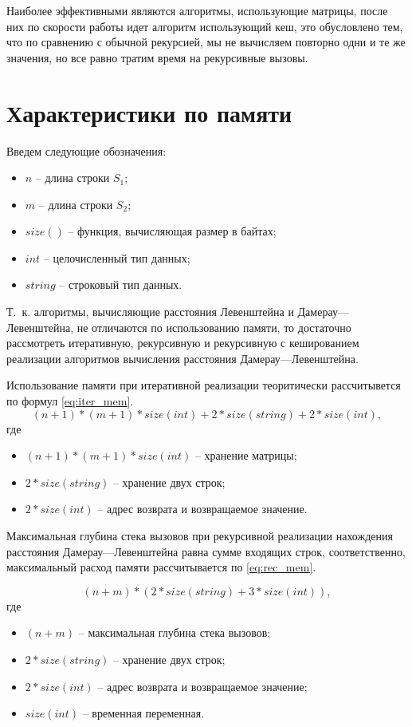 \clearpage

Наиболее эффективными являются алгоритмы, использующие матрицы, после них по скорости работы идет алгоритм использующий кеш, это обусловлено тем, что по сравнению с обычной рекурсией, мы не вычисляем повторно одни и те же значения, но все равно тратим время на рекурсивные вызовы. 

\section{Характеристики по памяти}

\label{memory}

Введем следующие обозначения:
\begin{itemize}
	\item $n$ -- длина строки $S_1$;
	\item $m$ -- длина строки $S_2$;
	\item $size()$ -- функция, вычисляющая размер в байтах;
	\item $int$ -- целочисленный тип данных;
	\item $string$ -- строковый тип данных.
\end{itemize}

Т.~к. алгоритмы, вычисляющие расстояния Левенштейна и Дамерау---Левенштейна, не отличаются по использованию памяти, то достаточно рассмотреть итеративную, рекурсивную и рекурсивную с кешированием реализации алгоритмов вычисления расстояния Дамерау---Левенштейна.


Использование памяти при итеративной реализации теоритически рассчитывется по формул \eqref{eq:iter_mem}.
\begin{equation}
	\label{eq:iter_mem}
	(n + 1) * (m + 1) * size(int) + 2 * size(string) + 2 * size(int),
\end{equation}
где 
\begin{itemize}
	\item $ (n + 1) * (m + 1) * size(int) $ -- хранение матрицы;
	\item $ 2 * size(string) $ -- хранение двух строк;
	\item $ 2 * size(int) $ -- адрес возврата и возвращаемое значение.
\end{itemize}


Максимальная глубина стека вызовов при рекурсивной реализации
нахождения расстояния Дамерау---Левенштейна равна сумме входящих строк,
соответственно, максимальный расход памяти рассчитывается по \eqref{eq:rec_mem}.

\begin{equation}
	\label{eq:rec_mem}
	(n + m) * (2 * size(string) + 3 * size(int)),
\end{equation}
где 
\begin{itemize}
	\item $ (n + m) $ -- максимальная глубина стека вызовов;
	\item $ 2 * size(string) $ -- хранение двух строк;
	\item $ 2 * size(int) $ -- адрес возврата и возвращаемое значение;
	\item $ size(int) $ -- временная переменная.
\end{itemize}

